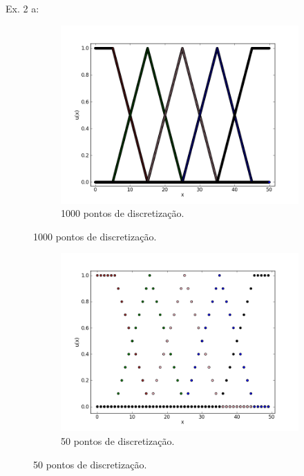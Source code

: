 \documentclass{report}
\begin{document}
\newpage

Ex. 2 a:
\begin{figure}[h]
        \begin{subfigure}[b]{0.6\textwidth}
                \centering
                \includegraphics[width=\textwidth]{ex1b1000.png}
	\caption{1000 pontos de discretização.}
        \end{subfigure}
\end{figure}
\begin{figure}[h]
	\begin{subfigure}[b]{0.6\textwidth}
                \centering
                \includegraphics[width=\textwidth]{ex2a50.png}
	\caption{50 pontos de discretização.}
	\end{subfigure}
\end{figure}
\end{document}
